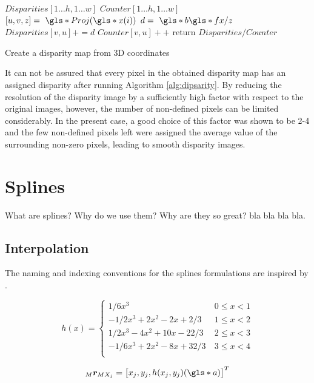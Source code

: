 \begin{algorithm}
  $Disparities[1\ldots h, 1\ldots w]$\;
  $Counter[1\ldots h, 1\ldots w]$\;
   {
    $[u,v,z] = \g{Proj}(\g{x}(i))$ \; 
    ${d} = \g{b} \g{fx} / z$ \;
    $Disparities[v,u] += d$\;
    $Counter[v,u]++$\;
  }
  return $Disparities / Counter$\;
  \caption{Create a disparity map from 3D coordinates}
  \label{alg:dipsarity}
\end{algorithm}

It can not be assured that every pixel in the obtained disparity map has an
assigned disparity after running Algorithm \ref{alg:dipsarity}. 
By reducing the resolution of the disparity image by a sufficiently high factor
with respect to the original images, however, the number of non-defined pixels can be
limited considerably. In the present case, a good choice of this factor was shown to be 
2-4 and the few non-defined pixels left were assigned the average
value of the surrounding non-zero pixels, leading to smooth disparity images.

\section{Splines}

What are splines? Why do we use them? Why are they so great?  bla bla bla bla.

\subsection{Interpolation} 

The naming and indexing conventions for the splines formulations are inspired by
\cite{Dominik}.


\begin{equation}
  h(x) = 
  \begin{cases}
     1/6x^3 & \ 0 \leq x < 1 \\
     -1/2x^3 + 2x^2 - 2x + 2/3 & \ 1 \leq x < 2 \\
     1/2x^3 - 4x^2 + 10x - 22/3 & \ 2 \leq x < 3 \\
     -1/6x^3 + 2x^2 - 8x + 32/3 & \ 3 \leq x < 4 \\
  \end{cases}
\end{equation}


\begin{equation*}
  \mrmx = \begin{bmatrix} x_j, y_j, h(x_j,y_j)(\g{a})\end{bmatrix} ^T
\end{equation*}
     
